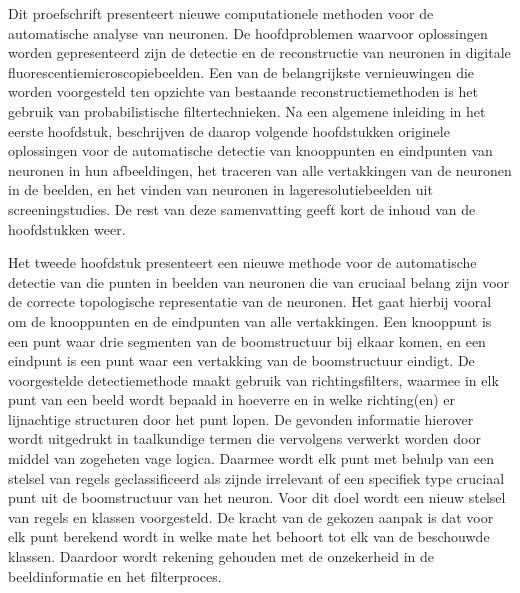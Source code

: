Dit proefschrift presenteert nieuwe computationele methoden voor de automatische analyse van neuronen. De hoofdproblemen waarvoor oplossingen worden gepresenteerd zijn de detectie en de reconstructie van neuronen in digitale fluorescentiemicroscopiebeelden. Een van de belangrijkste vernieuwingen die worden voorgesteld ten opzichte van bestaande reconstructiemethoden is het gebruik van probabilistische filtertechnieken. Na een algemene inleiding in het eerste hoofdstuk, beschrijven de daarop volgende hoofdstukken originele oplossingen voor de automatische detectie van knooppunten en eindpunten van neuronen in hun afbeeldingen, het traceren van alle vertakkingen van de neuronen in de beelden, en het vinden van neuronen in lageresolutiebeelden uit screeningstudies. De rest van deze samenvatting geeft kort de inhoud van de hoofdstukken weer.

Het tweede hoofdstuk presenteert een nieuwe methode voor de automatische detectie van die punten in beelden van neuronen die van cruciaal belang zijn voor de correcte topologische representatie van de neuronen. Het gaat hierbij vooral om de knooppunten en de eindpunten van alle vertakkingen. Een knooppunt is een punt waar drie segmenten van de boomstructuur bij elkaar komen, en een eindpunt is een punt waar een vertakking van de boomstructuur eindigt. De voorgestelde detectiemethode maakt gebruik van richtingsfilters, waarmee in elk punt van een beeld wordt bepaald in hoeverre en in welke richting(en) er lijnachtige structuren door het punt lopen. De gevonden informatie hierover wordt uitgedrukt in taalkundige termen die vervolgens verwerkt worden door middel van zogeheten vage logica. Daarmee wordt elk punt met behulp van een stelsel van regels geclassificeerd als zijnde irrelevant of een specifiek type cruciaal punt uit de boomstructuur van het neuron. Voor dit doel wordt een nieuw stelsel van regels en klassen voorgesteld. De kracht van de gekozen aanpak is dat voor elk punt berekend wordt in welke mate het behoort tot elk van de beschouwde klassen. Daardoor wordt rekening gehouden met de onzekerheid in de beeldinformatie en het filterproces.

